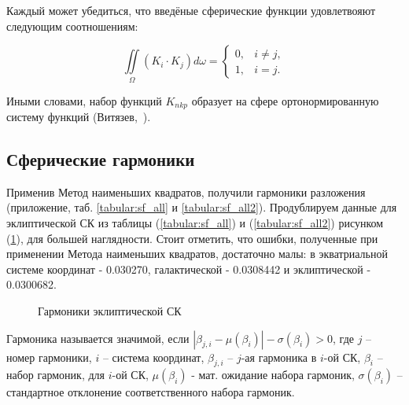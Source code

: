 \documentclass[14pt]{article} %
\begin{document}
Каждый может убедиться, что введёные сферические функции удовлетвояют следующим соотношениям:

\begin{equation}
\iint\limits_\Omega \left(K_i \cdot K_j \right) d\omega =  \left\{ \begin{array}{cc}
0, & i \neq j,\\
1, & i = j.
\end{array} \right.
\end{equation}

Иными словами, набор функций $K_{nkp}$ образует на сфере ортонормированную систему функций (Витязев,~\cite{book:sf}). 


\subsection{Сферические гармоники}\label{sistem}  
Применив Метод наименьших квадратов, получили гармоники разложения (приложение, таб. \ref{tabular:sf_all} и \ref{tabular:sf_all2}). Продублируем данные для эклиптической СК из таблицы (\ref{tabular:sf_all}) и (\ref{tabular:sf_all2}) рисунком (\ref{img:sf_j}), для большей наглядности. Стоит отметить, что ошибки, полученные при применении Метода наименьших квадратов, достаточно малы: в экватриальной системе координат - 0.030270, галактической - 0.0308442 и эклиптической - 0.0300682.

\begin{figure}[h!]
\caption{Гармоники эклиптической СК}
\label{img:sf_j}
\end{figure}

Гармоника называется значимой, если $|\beta_{j,i} - \mu (\beta_{i})| - \sigma(\beta_{i}) > 0$, где $j$ -- номер гармоники, $i$ -- система координат, $\beta_{j,i}$ -- $j$-ая гармоника в $i$-ой СК, $\beta_{i}$ -- набор гармоник, для $i$-ой СК,  $\mu(\beta_{i})$ - мат. ожидание набора гармоник, $\sigma(\beta_{i})$ -- стандартное отклонение соответственного набора гармоник.
\end{document}
